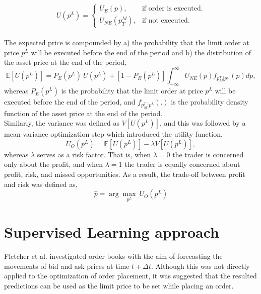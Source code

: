 \begin{equation}
    U(p^L) = \begin{cases}
                U_E(p), & \text{if order is executed}.\\
                U_{NE}(p_T^M), & \text{if not executed}.
             \end{cases}
\end{equation}
\hfill
\\
The expected price is compounded by a) the probability that the limit order at price $p^L$ will be executed before the end of the period and b) the distribution of the asset price at the end of the period,
\begin{equation}
    \mathbb{E}[U(p^L)] = P_E(p^L)\ U(p^L) + [1-P_E(p^L)] \int_{-\infty}^{\infty} U_{NE}(p) f_{p_M^T | p^L}(p) dp,
\end{equation}
whereas $P_E(p^L)$ is the probability that the limit order at price $p^L$ will be executed before the end of the period, and $f_{p_M^T | p^L}(.)$ is the probability density function of the asset price at the end of the period. 
\\
Similarly, the variance was defined as $V[U(p^L)]$, and this was followed by a mean variance optimization step which introduced the utility function,
\begin{equation}
    U_O(p^L) = \mathbb{E}[U(p^L)] - \lambda V[U(p^L)],
\end{equation}
whereas $\lambda$ serves as a risk factor.
That is, when $\lambda=0$ the trader is concerned only about the profit, and when $\lambda=1$ the trader is equally concerned about profit, risk, and missed opportunities.
As a result, the trade-off between profit and risk was defined as,
\begin{equation}
    \hat{p} = \arg\max_{p^L}\ U_O(p^L)
\end{equation}


\section{Supervised Learning approach}
\label{sec:related-supervised}

Fletcher et al. \cite{fletcher2010multiple} investigated order books with the aim of forecasting the movements of bid and ask prices at time $t+\Delta{t}$.
Although this was not directly applied to the optimization of order placement, it was suggested that the resulted predictions can be used as the limit price to be set while placing an order.

